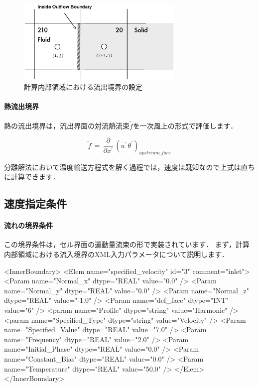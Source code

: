 \begin{figure}[htbp]
\begin{center}
\includegraphics[width=8cm,clip]{outflowBC_inner.eps}
\end{center}
\caption{計算内部領域における流出境界の設定}
\label{fig:outflow BC inner}
\end{figure}

%
\paragraph{熱流出境界}
熱の流出境界は，流出界面の対流熱流束$\tilde{f}$を一次風上の形式で評価します．

\begin{equation}
\tilde{f} \,=\, \frac{\partial}{\partial x^{\prime}}\, \left( u^{\prime}\,\theta^{\prime} \right)_{upstream\_face}
\label{eq:outflow heat flux}
\end{equation}

分離解法において温度輸送方程式を解く過程では，速度は既知なので上式は直ちに計算できます．


\subsection{速度指定条件}

\paragraph{流れの境界条件}
この境界条件は，セル界面の運動量流束の形で実装されています．
まず，計算内部領域における流入境界のXML入力パラメータについて説明します．

{\small
\begin{program}
<InnerBoundary> 
  <Elem name="specified_velocity" id="3" comment="inlet">
    <Param name="Normal_x"        dtype="REAL"   value="0.0" />
    <Param name="Normal_y"        dtype="REAL"   value="0.0" />
    <Param name="Normal_z"        dtype="REAL"   value="-1.0" />
    <Param name="def_face"        dtype="INT"    value="6" />
    <param name="Profile"         dtype="string" value="Harmonic" />
    <param name="Specified_Type"  dtype="string" value="Velocity" />
    <Param name="Specified_Value" dtype="REAL"   value="7.0" />
    <Param name="Frequency"       dtype="REAL"   value="2.0" />
    <Param name="Initial_Phase"   dtype="REAL"   value="0.0" />
    <Param name="Constant_Bias"   dtype="REAL"   value="0.0" />
    <Param name="Temperature"     dtype="REAL"   value="50.0" />
  </Elem>
</InnerBoundary>
\end{program}
}


